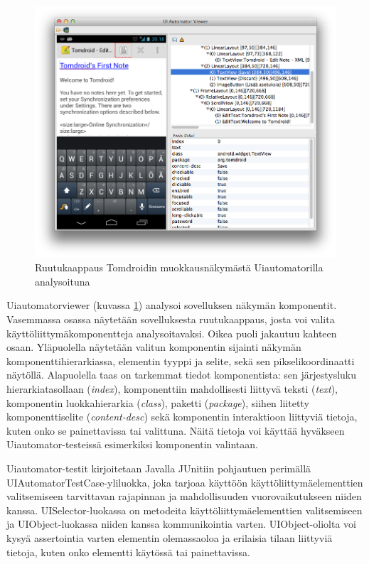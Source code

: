 \begin{figure}[htb]
\includegraphics[width=160mm]{uiautomatorviewer.png}
\caption{Ruutukaappaus Tomdroidin muokkausnäkymästä Uiautomatorilla analysoituna} \label{uiautomatorviewer}
\end{figure}

Uiautomatorviewer (kuvassa \ref{uiautomatorviewer}) analysoi sovelluksen näkymän komponentit. Vasemmassa osassa näytetään sovelluksesta ruutukaappaus, josta voi valita käyttöliittymäkomponentteja analysoitavaksi. Oikea puoli jakautuu kahteen osaan. Yläpuolella näytetään valitun komponentin sijainti näkymän komponenttihierarkiassa, elementin tyyppi ja selite, sekä sen pikselikoordinaatti näytöllä. Alapuolella taas on tarkemmat tiedot komponentista: sen järjestysluku hierarkiatasollaan (\emph{index}), komponenttiin mahdollisesti liittyvä teksti (\emph{text}), komponentin luokkahierarkia (\emph{class}), paketti (\emph{package}), siihen liitetty komponenttiselite (\emph{content-desc}) sekä komponentin interaktioon liittyviä tietoja, kuten onko se painettavissa tai valittuna. Näitä tietoja voi käyttää hyväkseen Uiautomator-testeissä esimerkiksi komponentin valintaan.

Uiautomator-testit kirjoitetaan Javalla JUnitiin pohjautuen perimällä UIAutomatorTestCase-yliluokka, joka tarjoaa käyttöön käyttöliittymäelementtien valitsemiseen tarvittavan rajapinnan ja mahdollisuuden vuorovaikutukseen niiden kanssa. UISelector-luokassa on metodeita käyttöliittymäelementtien valitsemiseen ja UIObject-luokassa niiden kanssa kommunikointia varten. UIObject-oliolta voi kysyä assertointia varten elementin olemassaoloa ja erilaisia tilaan liittyviä tietoja, kuten onko elementti käytössä tai painettavissa.

